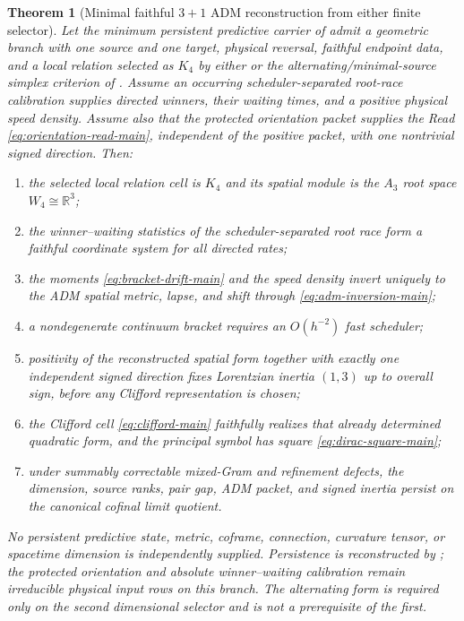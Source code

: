 \documentclass[11pt]{article}
\newtheorem{theorem}{Theorem}[section]
\theoremstyle{definition}
\theoremstyle{remark}
\newcommand{\R}{\mathbb R}
\begin{document}
\begin{theorem}[Minimal faithful $3+1$ ADM reconstruction from either finite selector]
\label{mt:adm}
Let the minimum persistent predictive carrier of  admit a
geometric branch with one source and one target, physical reversal, faithful
endpoint data, and a local relation selected as $K_4$ by either
 or the alternating/minimal-source simplex
criterion of .  Assume an occurring
scheduler-separated root-race calibration supplies directed winners, their
waiting times, and a positive physical speed density.  Assume also that the
protected orientation packet supplies the Read
\eqref{eq:orientation-read-main}, independent of the positive packet, with one
nontrivial signed direction.  Then:
\begin{enumerate}[label=\textup{(\roman*)},leftmargin=2.8em]
\item the selected local relation cell is $K_4$ and its spatial module is the
      $A_3$ root space $W_4\cong\R^3$;
\item the winner--waiting statistics of the scheduler-separated root race form
      a faithful coordinate system for all directed rates;
\item the moments \eqref{eq:bracket-drift-main} and the speed density invert
      uniquely to the ADM spatial metric, lapse, and shift through
      \eqref{eq:adm-inversion-main};
\item a nondegenerate continuum bracket requires an $O(h^{-2})$ fast scheduler;
\item positivity of the reconstructed spatial form together with exactly one
      independent signed direction fixes Lorentzian inertia $(1,3)$ up to
      overall sign, before any Clifford representation is chosen;
\item the Clifford cell \eqref{eq:clifford-main} faithfully realizes that
      already determined quadratic form, and the principal symbol has square
      \eqref{eq:dirac-square-main};
\item under summably correctable mixed-Gram and refinement defects, the
      dimension, source ranks, pair gap, ADM packet, and signed inertia persist
      on the canonical cofinal limit quotient.
\end{enumerate}
No persistent predictive state, metric, coframe, connection, curvature tensor,
or spacetime dimension is independently supplied.  Persistence is reconstructed
by ; the protected orientation and absolute
winner--waiting calibration remain irreducible physical input rows on this
branch.  The alternating form is required only on the second dimensional
selector and is not a prerequisite of the first.
\end{theorem}
\end{document}
